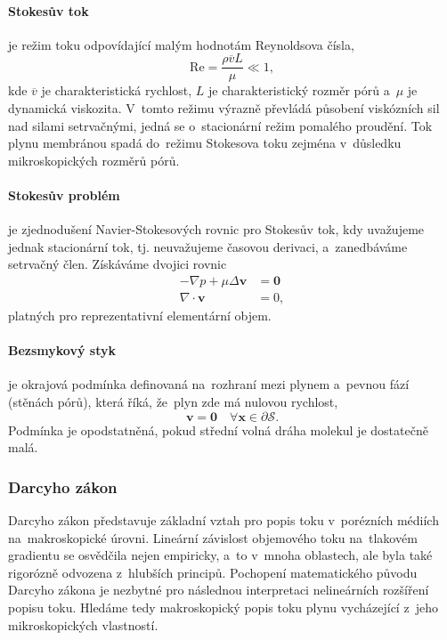 \paragraph{Stokesův tok}  je režim toku odpovídající malým hodnotám Reynoldsova čísla,
\begin{equation}
    \mathrm{Re}=\frac{\rho \overline{v}L}{\mu}\ll1,
\end{equation}
kde $\overline{v}$ je charakteristická rychlost, $L$ je charakteristický rozměr pórů a~$\mu$ je dynamická viskozita. V~tomto režimu výrazně převládá působení viskózních sil nad silami setrvačnými, jedná se o~stacionární režim pomalého proudění. Tok plynu membránou spadá do~režimu Stokesova toku zejména v~důsledku mikroskopických rozměrů pórů.

\paragraph{Stokesův problém} je zjednodušení Navier-Stokesových rovnic pro Stokesův tok, kdy uvažujeme jednak stacionární tok, tj. neuvažujeme časovou derivaci, a~zanedbáváme setrvačný člen. Získáváme dvojici rovnic
\begin{subequations}
    \begin{align}
    -\nabla p+\mu \Delta \bm{v}&=\bm{0}\\
    \nabla\cdot\bm{v}&=0,
    \end{align}
\end{subequations}
platných pro reprezentativní elementární objem.

\paragraph{Bezsmykový styk}  je okrajová podmínka definovaná na~rozhraní mezi plynem a~pevnou fází (stěnách pórů), která říká, že~plyn zde má nulovou rychlost,
\begin{equation}
    \bm{v}=\bm{0}\quad\forall \bm{x} \in \partial{\mathcal{S}}.
\end{equation}
Podmínka je opodstatněná, pokud střední volná dráha molekul je dostatečně malá.

\subsubsection{Darcyho zákon}\label{sss:darcyho_zakon}
Darcyho zákon představuje základní vztah pro popis toku v~porézních médiích na~makroskopické úrovni. Lineární závislost objemového toku na~tlakovém gradientu se osvědčila nejen empiricky, a~to v~mnoha oblastech, ale byla také rigorózně odvozena z~hlubších principů. Pochopení matematického původu Darcyho zákona je nezbytné pro následnou interpretaci nelineárních rozšíření popisu toku. Hledáme tedy makroskopický popis toku plynu vycházející z~jeho mikroskopických vlastností.

